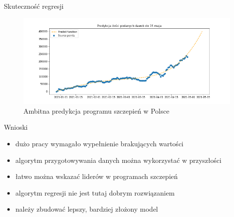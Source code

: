 \documentclass[11pt]{beamer}
\begin{document}
\begin{frame}{Skuteczność regresji}
\begin{figure}[h!]
\centering
\includegraphics[scale=0.4]{../img/demand1.png} 
\caption{Ambitna predykcja programu szczepień w Polsce}
\label{Rys:poland}
\end{figure}
\end{frame}

\begin{frame}{Wnioski}
\begin{itemize}
\item dużo pracy wymagało wypełnienie brakujących wartości
\item algorytm przygotowywania danych można wykorzystać w przyszłości
\item łatwo można wskazać liderów w programach szczepień
\item algorytm regresji nie jest tutaj dobrym rozwiązaniem 
\item należy zbudować lepszy, bardziej złożony model
\end{itemize}
\end{frame}
\end{document}
